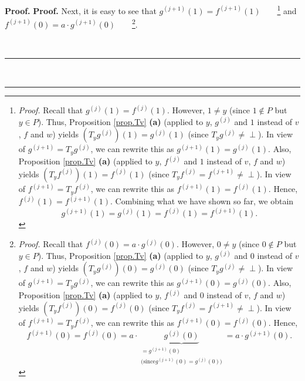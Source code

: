 \documentclass[numbers=enddot,12pt,final,onecolumn,notitlepage]{scrartcl}%
\theoremstyle{definition}
\newenvironment{verlong}{}{}
\newcommand{\undf}{\operatorname*{\bot}}
\newenvironment{proof}[1][Proof]{\noindent\textbf{#1.} }{\ \rule{0.5em}{0.5em}}
\begin{document}
\begin{verlong}
\begin{proof}
\begin{proof}
Next, it is easy to see that $g^{\left(  j+1\right)  }\left(  1\right)
=f^{\left(  j+1\right)  }\left(  1\right)  $\ \ \ \ \footnote{\textit{Proof.}
Recall that $g^{\left(  j\right)  }\left(  1\right)  =f^{\left(  j\right)
}\left(  1\right)  $. However, $1\neq y$ (since $1\notin P$ but $y\in P$).
Thus, Proposition \ref{prop.Tv} \textbf{(a)} (applied to $y$, $g^{\left(
j\right)  }$ and $1$ instead of $v$, $f$ and $w$) yields $\left(
T_{y}g^{\left(  j\right)  }\right)  \left(  1\right)  =g^{\left(  j\right)
}\left(  1\right)  $ (since $T_{y}g^{\left(  j\right)  }\neq\undf$). In view
of $g^{\left(  j+1\right)  }=T_{y}g^{\left(  j\right)  }$, we can rewrite this
as $g^{\left(  j+1\right)  }\left(  1\right)  =g^{\left(  j\right)  }\left(
1\right)  $. Also, Proposition \ref{prop.Tv} \textbf{(a)} (applied to $y$,
$f^{\left(  j\right)  }$ and $1$ instead of $v$, $f$ and $w$) yields $\left(
T_{y}f^{\left(  j\right)  }\right)  \left(  1\right)  =f^{\left(  j\right)
}\left(  1\right)  $ (since $T_{y}f^{\left(  j\right)  }=f^{\left(
j+1\right)  }\neq\undf$). In view of $f^{\left(  j+1\right)  }=T_{y}f^{\left(
j\right)  }$, we can rewrite this as $f^{\left(  j+1\right)  }\left(
1\right)  =f^{\left(  j\right)  }\left(  1\right)  $. Hence, $f^{\left(
j\right)  }\left(  1\right)  =f^{\left(  j+1\right)  }\left(  1\right)  $.
Combining what we have shown so far, we obtain%
\[
g^{\left(  j+1\right)  }\left(  1\right)  =g^{\left(  j\right)  }\left(
1\right)  =f^{\left(  j\right)  }\left(  1\right)  =f^{\left(  j+1\right)
}\left(  1\right)  .
\]
} and $f^{\left(  j+1\right)  }\left(  0\right)  =a\cdot g^{\left(
j+1\right)  }\left(  0\right)  $\ \ \ \ \footnote{\textit{Proof.} Recall that
$f^{\left(  j\right)  }\left(  0\right)  =a\cdot g^{\left(  j\right)  }\left(
0\right)  $. However, $0\neq y$ (since $0\notin P$ but $y\in P$). Thus,
Proposition \ref{prop.Tv} \textbf{(a)} (applied to $y$, $g^{\left(  j\right)
}$ and $0$ instead of $v$, $f$ and $w$) yields $\left(  T_{y}g^{\left(
j\right)  }\right)  \left(  0\right)  =g^{\left(  j\right)  }\left(  0\right)
$ (since $T_{y}g^{\left(  j\right)  }\neq\undf$). In view of $g^{\left(
j+1\right)  }=T_{y}g^{\left(  j\right)  }$, we can rewrite this as $g^{\left(
j+1\right)  }\left(  0\right)  =g^{\left(  j\right)  }\left(  0\right)  $.
Also, Proposition \ref{prop.Tv} \textbf{(a)} (applied to $y$, $f^{\left(
j\right)  }$ and $0$ instead of $v$, $f$ and $w$) yields $\left(
T_{y}f^{\left(  j\right)  }\right)  \left(  0\right)  =f^{\left(  j\right)
}\left(  0\right)  $ (since $T_{y}f^{\left(  j\right)  }=f^{\left(
j+1\right)  }\neq\undf$). In view of $f^{\left(  j+1\right)  }=T_{y}f^{\left(
j\right)  }$, we can rewrite this as $f^{\left(  j+1\right)  }\left(
0\right)  =f^{\left(  j\right)  }\left(  0\right)  $. Hence,%
\[
f^{\left(  j+1\right)  }\left(  0\right)  =f^{\left(  j\right)  }\left(
0\right)  =a\cdot\underbrace{g^{\left(  j\right)  }\left(  0\right)
}_{\substack{=g^{\left(  j+1\right)  }\left(  0\right)  \\\text{(since
}g^{\left(  j+1\right)  }\left(  0\right)  =g^{\left(  j\right)  }\left(
0\right)  \text{)}}}=a\cdot g^{\left(  j+1\right)  }\left(  0\right)  .
\]
}.


\end{proof}
\end{proof}
\end{verlong}
\end{document}

